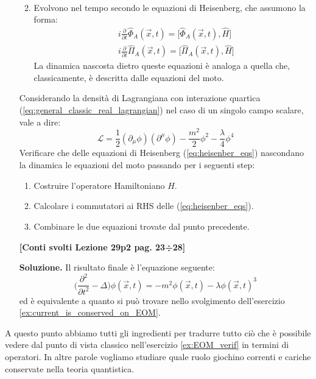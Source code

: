 \documentclass[../main.tex]{subfiles}
\begin{document}
\begin{itemize}
\begin{enumerate}
\begin{equation}
\begin{aligned}
            \end{aligned}
            \label{eq:equal_time_commrels}
        \end{equation}
        \item Evolvono nel tempo secondo le equazioni di Heisenberg, che assumono la forma:
        \begin{equation}
            \begin{aligned}
                &i\frac{\partial}{\partial t}\hat{\Phi}_A(\Vec{x}, t) = \big[\hat{\Phi}_A(\Vec{x}, t), \hat{H}\big]\\
                &i\frac{\partial}{\partial t}\hat{\Pi}_A(\Vec{x}, t)= \big[\hat{\Pi}_A(\Vec{x}, t), \hat{H}\big]
            \end{aligned}
            \label{eq:heisenber_eqs}
        \end{equation}
        La dinamica nascosta dietro queste equazioni è analoga a quella che, classicamente, è descritta dalle equazioni del moto.
    \end{enumerate}
    \begin{exercise}
    Considerando la densità di Lagrangiana con interazione quartica (\ref{eq:general_classic_real_lagrangian}) nel caso di un singolo campo scalare, vale a dire:
    \begin{equation}
        \mathscr{L} = \frac{1}{2}(\partial_\mu\phi)(\partial^\mu\phi) - \frac{m^2}{2}\phi^2 - \frac{\lambda}{4}\phi^4
        \label{eq:quarticint_scalar_lagrangian}
    \end{equation}
    Verificare che delle equazioni di Heisenberg (\ref{eq:heisenber_eqs}) nascondano la dinamica le equazioni del moto passando per i seguenti step:
    \begin{enumerate}
        \item Costruire l'operatore Hamiltoniano $\hat{H}$.
        \item Calcolare i commutatori ai RHS delle (\ref{eq:heisenber_eqs}).
        \item Combinare le due equazioni trovate dal punto precedente.
    \end{enumerate}
    \textbf{[Conti svolti Lezione 29p2 pag. 23÷28]}

    \textbf{Soluzione. } Il risultato finale è l'equazione seguente:
    \begin{equation}
        \Big(\frac{\partial^2}{\partial t^2} - \Delta\Big)\phi(\Vec{x}, t) = -m^2\phi(\Vec{x}, t) - \lambda\phi(\Vec{x}, t)^3
        \label{eq:scalar_field_EOM_from_commutators}
    \end{equation}
    ed è equivalente a quanto si può trovare nello svolgimento dell'esercizio \ref{ex:current_is_conserved_on_EOM}.
    \label{ex:EOM_verif}
\end{exercise}
\end{itemize}
A questo punto abbiamo tutti gli ingredienti per tradurre tutto ciò che è possibile vedere dal punto di vista classico nell'esercizio \ref{ex:EOM_verif} in termini di operatori. In altre parole vogliamo studiare quale ruolo giochino correnti e cariche conservate nella teoria quantistica.
\end{document}

